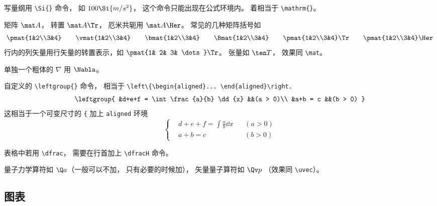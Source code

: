 写量纲用 \verb|\Si{}| 命令， 如 $100\Si{m/s^2}$， 这个命令只能出现在公式环境内。 着相当于 \verb|\mathrm{}|。

矩阵 $\mat A$， 转置 $\mat A\Tr$， 厄米共轭用 $\mat A\Her$。 常见的几种矩阵括号如
\begin{equation}
\pmat{1&2\\3&4} \qquad
\vmat{1&2\\3&4} \qquad 
\bmat{1&2\\3&4} \qquad
\Bmat{1&2\\3&4} \qquad
\pmat{1&2\\3&4}\Tr \qquad
\pmat{1&2\\3&4}\Her
\end{equation}
行内的列矢量用行矢量的转置表示，如 $\pmat{1& 2& 3& \dots}\Tr$。 张量如 $\ten T$， 效果同 \verb|\mat|。

单独一个粗体的 $\nabla$ 用 $\Nabla$。

自定义的 \verb|\leftgroup{}| 命令， 相当于 \verb|\left\{\begin{aligned}... \end{aligned}\right.|
\begin{equation}
\leftgroup{
&d+e+f = \int \frac{a}{b} \dd{x} &&(a > 0)\\
&a+b = c &&(b > 0)
}
\end{equation}
这相当于一个可变尺寸的 \verb|{| 加上 \verb|aligned| 环境
\begin{equation}
\left\{
\begin{aligned}
&d+e+f = \int \frac{a}{b} \dd{x} &&(a > 0)\\
&a+b = c &&(b > 0)
\end{aligned}
\right.
\end{equation}

表格中若用 \verb|\dfrac|， 需要在行首加上 \verb|\dfracH| 命令。%

量子力学算符如 $\Q a$（一般可以不加， 只有必要的时候加）， 矢量量子算符如 $\Qv p$ （效果同 \verb|\uvec|）。

\subsection{图表}


